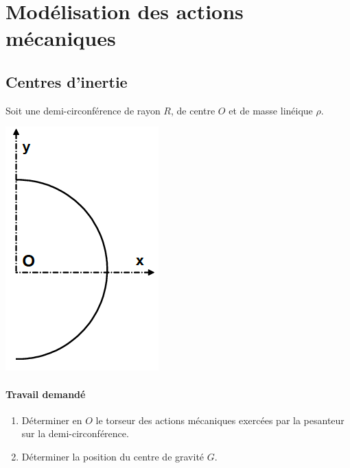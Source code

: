 \chapter{Modélisation des actions mécaniques}
\thispagestyle{plain} %
\newpage


\section{Centres d'inertie}

Soit une demi-circonférence de rayon $R$, de centre $O$ et de masse linéique $\rho$.

\begin{center}
\includegraphics[scale=0.5]{png/demi-circonference.png}
\end{center}

\subsubsection{Travail demandé}
\begin{enumerate}
\item Déterminer en $O$ le torseur des actions mécaniques exercées par la
pesanteur sur la demi-circonférence.
\item Déterminer la position du centre de gravité $G$.
\end{enumerate}

